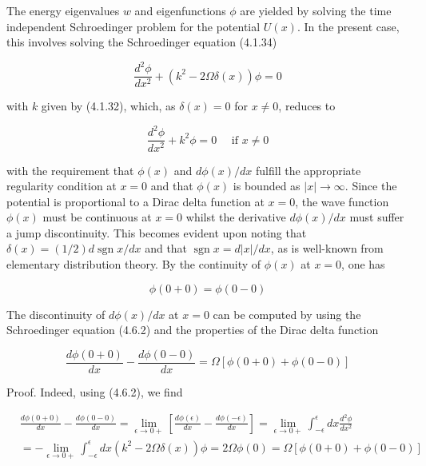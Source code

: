 \documentclass{article}
\begin{document}
The energy eigenvalues $w$ and eigenfunctions $\phi$ are yielded by solving the time independent Schroedinger problem for the potential $U(x)$. In the present case, this involves solving the Schroedinger equation (4.1.34)
 
\begin{equation*}
\frac{d^{2} \phi}{d x^{2}}+\left(k^{2}-2 \Omega \delta(x)\right) \phi=0 \tag{4.6.2}
\end{equation*}
 
with $k$ given by (4.1.32), which, as $\delta(x)=0$ for $x \neq 0$, reduces to
 
\begin{equation*}
\frac{d^{2} \phi}{d x^{2}}+k^{2} \phi=0 \quad \text { if } x \neq 0 \tag{4.6.3}
\end{equation*}
 
with the requirement that $\phi(x)$ and $d \phi(x) / d x$ fulfill the appropriate regularity condition at $x=0$ and that $\phi(x)$ is bounded as $|x| \rightarrow \infty$. Since the potential is proportional to a Dirac delta function at $x=0$, the wave function $\phi(x)$ must be continuous at $x=0$ whilst the derivative $d \phi(x) / d x$ must suffer a jump discontinuity. This becomes evident upon noting that $\delta(x)=(1 / 2) d \operatorname{sgn} x / d x$ and that $\operatorname{sgn} x=d|x| / d x$, as is well-known from elementary distribution theory. By the continuity of $\phi(x)$ at $x=0$, one has
 
\begin{equation*}
\phi(0+0)=\phi(0-0) \tag{4.6.4}
\end{equation*}
 

The discontinuity of $d \phi(x) / d x$ at $x=0$ can be computed by using the Schroedinger equation (4.6.2) and the properties of the Dirac delta function
 
\begin{equation*}
\frac{d \phi(0+0)}{d x}-\frac{d \phi(0-0)}{d x}=\Omega[\phi(0+0)+\phi(0-0)] \tag{4.6.5}
\end{equation*}
 

Proof. Indeed, using (4.6.2), we find
 
\begin{align*}
& \frac{d \phi(0+0)}{d x}-\frac{d \phi(0-0)}{d x}=\lim _{\epsilon \rightarrow 0+}\left[\frac{d \phi(\epsilon)}{d x}-\frac{d \phi(-\epsilon)}{d x}\right]=\lim _{\epsilon \rightarrow 0+} \int_{-\epsilon}^{\epsilon} d x \frac{d^{2} \phi}{d x^{2}}  \tag{4.6.6}\\
& =-\lim _{\epsilon \rightarrow 0+} \int_{-\epsilon}^{\epsilon} d x\left(k^{2}-2 \Omega \delta(x)\right) \phi=2 \Omega \phi(0)=\Omega[\phi(0+0)+\phi(0-0)]
\end{align*}
 
\end{document}
